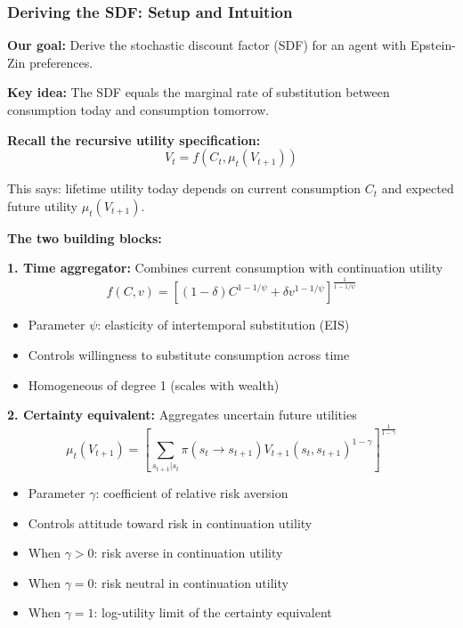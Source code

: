 \documentclass{beamer}
\begin{document}

\begin{frame}[allowframebreaks]
    \frametitle{Deriving the SDF: Setup and Intuition}
    
    \textbf{Our goal:} Derive the stochastic discount factor (SDF) for an agent with Epstein-Zin preferences.
    
    \textbf{Key idea:} The SDF equals the marginal rate of substitution between consumption today and consumption tomorrow.
    
    \textbf{Recall the recursive utility specification:}
    \begin{equation*}
        V_t = f(C_t, \mu_t(V_{t+1}))
    \end{equation*}
    
    This says: lifetime utility today depends on current consumption $C_t$ and expected future utility $\mu_t(V_{t+1})$.
    
    \framebreak
    
    \textbf{The two building blocks:}
    
    \textbf{1. Time aggregator:} Combines current consumption with continuation utility
    \begin{equation*}
        f(C, v) = \left[ (1-\delta)C^{1-1/\psi} + \delta v^{1-1/\psi} \right]^{\frac{1}{1-1/\psi}}
    \end{equation*}
    \begin{itemize}
        \item Parameter $\psi$: elasticity of intertemporal substitution (EIS)
        \item Controls willingness to substitute consumption across time
        \item Homogeneous of degree 1 (scales with wealth)
    \end{itemize}
    
    \framebreak
    
    \textbf{2. Certainty equivalent:} Aggregates uncertain future utilities
    \begin{equation*}
        \mu_t(V_{t+1}) = \left[ \sum_{s_{t+1}|s_t} \pi(s_t \to s_{t+1})V_{t+1}(s_t, s_{t+1})^{1-\gamma} \right]^{\frac{1}{1-\gamma}}
    \end{equation*}
    \begin{itemize}
        \item Parameter $\gamma$: coefficient of relative risk aversion
        \item Controls attitude toward risk in continuation utility
        \item When $\gamma > 0$: risk averse in continuation utility
        \item When $\gamma = 0$: risk neutral in continuation utility
        \item When $\gamma = 1$: log-utility limit of the certainty equivalent
    \end{itemize}
    

\end{frame}
\end{document}
